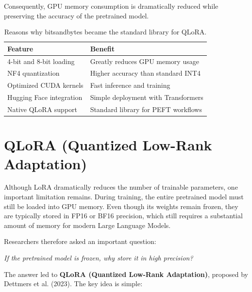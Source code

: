 Consequently, GPU memory consumption is dramatically reduced while preserving the accuracy of the pretrained model.
\begin{table}[H]
\centering
\caption{Reasons why bitsandbytes became the standard library for QLoRA.}

\renewcommand{\arraystretch}{1.3}

\begin{tabular}{p{7cm}p{7cm}}
\toprule
\textbf{Feature} & \textbf{Benefit} \\
\midrule

4-bit and 8-bit loading &
Greatly reduces GPU memory usage \\

NF4 quantization &
Higher accuracy than standard INT4 \\

Optimized CUDA kernels &
Fast inference and training \\

Hugging Face integration &
Simple deployment with Transformers \\

Native QLoRA support &
Standard library for PEFT workflows \\

\bottomrule
\end{tabular}

\end{table}


\section{QLoRA (Quantized Low-Rank Adaptation)}

Although LoRA dramatically reduces the number of trainable parameters, one important limitation remains. During training, the entire pretrained model must still be loaded into GPU memory. Even though its weights remain frozen, they are typically stored in FP16 or BF16 precision, which still requires a substantial amount of memory for modern Large Language Models.

Researchers therefore asked an important question:

\begin{center}
\textit{If the pretrained model is frozen, why store it in high precision?}
\end{center}

The answer led to \textbf{QLoRA (Quantized Low-Rank Adaptation)}, proposed by Dettmers et al. (2023). The key idea is simple:

